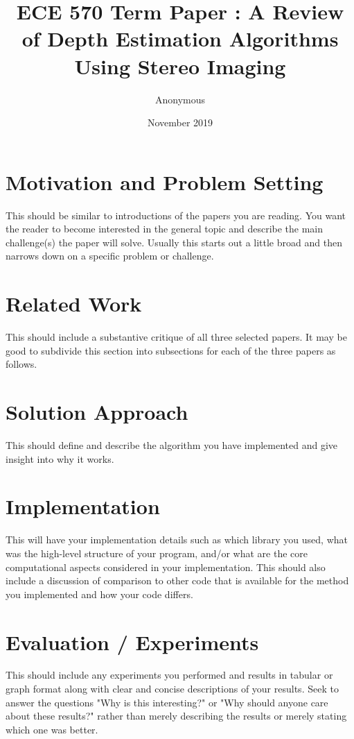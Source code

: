 \documentclass{article}
\title{ECE 570 Term Paper : A Review of Depth Estimation Algorithms Using Stereo Imaging}
\author{Anonymous}
\date{November 2019}
\begin{document}
\maketitle

\section{Motivation and Problem Setting}
This should be similar to introductions of the papers you are reading.  You want the reader to become interested in the general topic and describe the main challenge(s) the paper will solve.  Usually this starts out a little broad and then narrows down on a specific problem or challenge.

\section{Related Work}
This should include a substantive critique of all three selected papers.  It may be good to subdivide this section into subsections for each of the three papers as follows.

\section{Solution Approach}
This should define and describe the algorithm you have implemented and give insight into why it works.

\section{Implementation}
This will have your implementation details such as which library you used, what was the high-level structure of your program, and/or what are the core computational aspects considered in your implementation.  This should also include a discussion of comparison to other code that is available for the method you implemented and how your code differs.

\section{Evaluation / Experiments}
This should include any experiments you performed and results in tabular or graph format along with clear and concise descriptions of your results.  Seek to answer the questions "Why is this interesting?" or "Why should anyone care about these results?" rather than merely describing the results or merely stating which one was better.
\end{document}
